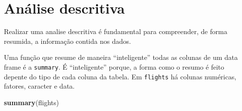 \documentclass[
]{book}
\newenvironment{Shaded}{\begin{snugshade}}{\end{snugshade}}
\newcommand{\FunctionTok}[1]{\textcolor[rgb]{0.13,0.29,0.53}{\textbf{#1}}}
\newcommand{\NormalTok}[1]{#1}
\begin{document}
\section{Análise descritiva}\label{anuxe1lise-descritiva}

Realizar uma analise descritiva é fundamental para compreender, de forma resumida, a informação contida nos dados.

Uma função que resume de maneira ``inteligente'' todas as colunas de um data frame é a \texttt{summary}.
É ``inteligente'' porque, a forma como o resumo é feito depente do tipo de cada coluna da tabela.
Em \texttt{flights} há colunas numéricas, fatores, caracter e data.

\begin{Shaded}
\begin{Highlighting}[]
\FunctionTok{summary}\NormalTok{(flights)}
\end{Highlighting}
\end{Shaded}
\end{document}
